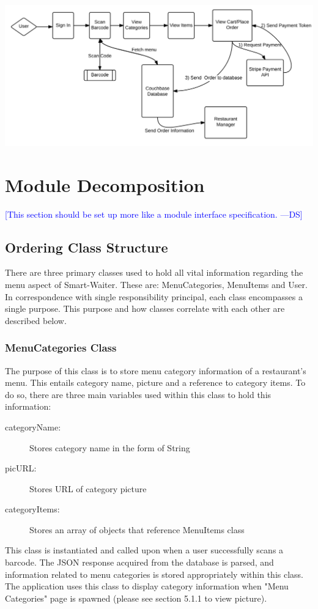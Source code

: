 \documentclass[12pt, titlepage]{article}
\newcommand{\authornote}[3]{\textcolor{#1}{[#3 ---#2]}}
\newcommand{\authornote}[3]{}
\newcommand{\ds}[1]{\authornote{blue}{DS}{#1}}
\begin{document}
\includegraphics[width=150mm,scale=0.5]{OverallOperation.png}

\section{Module Decomposition}

\ds{This section should be set up more like a module interface specification.}

\subsection{Ordering Class Structure}
There are three primary classes used to hold all vital information regarding the menu aspect of Smart-Waiter. These are: MenuCategories, MenuItems and User. In correspondence with single responsibility principal, each class encompasses a single purpose. This purpose and how classes correlate with each other are described below. 

\subsubsection{MenuCategories Class}
The purpose of this class is to store menu category information of a restaurant's menu. This entails category name, picture and a reference to category items. To do so, there are three main variables used within this class to hold this information: 

\begin{description}
  \item[categoryName:] Stores category name in the form of String
  \item[picURL:] Stores URL of category picture
  \item[categoryItems:] Stores an array of objects that reference MenuItems class
\end{description}


This class is instantiated and called upon when a user successfully scans a barcode. The JSON response acquired from the database is parsed, and information related to menu categories is stored appropriately within this class. The application uses this class to display category information when "Menu Categories" page is spawned (please see section 5.1.1 to view picture).
\end{document}
